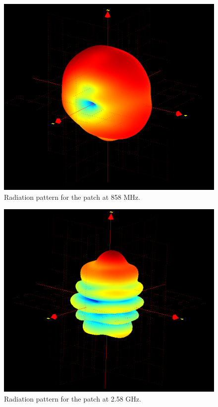 \begin{minipage}{0.48\textwidth}
\begin{figure}[H]
\centering
\includegraphics[width=1\textwidth]{figure/PatchNy858.png}
\caption{Radiation pattern for the patch at 858 MHz.}
\label{fig:Patch858}
\end{figure}
\end{minipage}
\hspace{0.02\textwidth}
\begin{minipage}{0.48\textwidth}
\begin{figure}[H]
\centering
\includegraphics[width=1\textwidth]{figure/PatchNy2580.png}
\caption{Radiation pattern for the patch at 2.58 GHz.}
\label{fig:Patch2580}
\end{figure}
\end{minipage}



